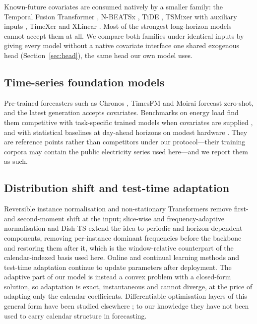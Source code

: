 Known-future covariates are consumed natively by a smaller family: the Temporal Fusion
Transformer \cite{lim2021tft}, N-BEATSx \cite{olivares2023nbeatsx}, TiDE \cite{das2023tide},
TSMixer with auxiliary inputs \cite{chen2023tsmixer}, TimeXer \cite{wang2024timexer} and
XLinear \cite{xlinear2026}. Most of the strongest long-horizon models cannot accept them at
all. We compare both families under identical inputs by giving every model without a native
covariate interface one shared exogenous head (Section~\ref{sec:head}), the same head our
own model uses.

\subsection{Time-series foundation models}
Pre-trained forecasters such as Chronos \cite{ansari2024chronos,chronos2}, TimesFM
\cite{das2024timesfm} and Moirai \cite{woo2024moirai} forecast zero-shot, and the latest
generation accepts covariates. Benchmarks on energy load find them competitive with
task-specific trained models when covariates are supplied \cite{fets2026}, and with
statistical baselines at day-ahead horizons on modest hardware \cite{tsfm2026energy}. They are reference points rather than
competitors under our protocol---their training corpora may contain the public electricity
series used here---and we report them as such.

\subsection{Distribution shift and test-time adaptation}
Reversible instance normalisation \cite{kim2022revin} and non-stationary Transformers
\cite{liu2022nonstationary} remove first- and second-moment shift at the input; slice-wise and
frequency-adaptive normalisation \cite{liu2023san,ye2024fan} and Dish-TS \cite{fan2023dishts}
extend the idea to periodic and horizon-dependent components, removing per-instance dominant
frequencies before the backbone and restoring them after it, which is the window-relative
counterpart of the calendar-indexed basis used here. Online and continual learning methods
\cite{pham2023fsnet,wen2023onenet} and test-time adaptation \cite{kim2025tta} continue to
update parameters after deployment. The adaptive part of our model is instead a convex problem
with a closed-form solution, so adaptation is exact, instantaneous and cannot diverge, at the
price of adapting only the calendar coefficients. Differentiable optimisation layers of this
general form have been studied elsewhere \cite{amos2017optnet,bertinetto2019closedform,%
gould2022ddn}; to our knowledge they have not been used to carry calendar structure in
forecasting.

